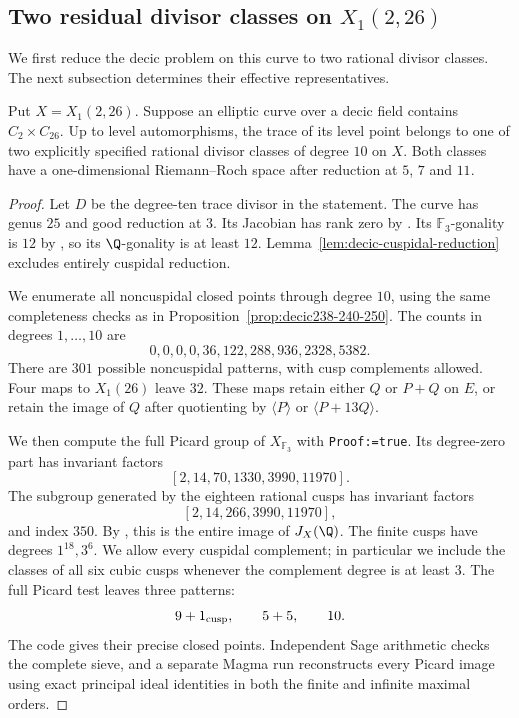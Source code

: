 \subsection{Two residual divisor classes on $X_1(2,26)$}
We first reduce the decic problem on this curve to two rational divisor
classes. The next subsection determines their effective representatives.
\begin{proposition}\label{prop:decic226-residual}
Put $X=X_1(2,26)$. Suppose an elliptic curve over a decic field
contains $C_2\times C_{26}$. Up to level automorphisms, the trace
of its level point belongs to one of two explicitly specified
rational divisor classes of degree $10$ on $X$. Both classes have a
one-dimensional Riemann--Roch space after reduction at $5$, $7$ and
$11$.
\end{proposition}
\begin{proof}
Let $D$ be the degree-ten trace divisor in the statement.
The curve has genus $25$ and good reduction at $3$. Its Jacobian has
rank zero by \cite[Theorem~4.1]{DS}.
Its $\mathbb F_3$-gonality is $12$ by \cite[Table~1]{NV}, so its
$\Q$-gonality is at least $12$. Lemma~\ref{lem:decic-cuspidal-reduction}
excludes entirely cuspidal reduction.

We enumerate all noncuspidal closed points through degree $10$,
using the same completeness checks as in
Proposition~\ref{prop:decic238-240-250}. The counts in degrees
$1,\ldots,10$ are
\[
 0,0,0,0,36,122,288,936,2328,5382.
\]
There are $301$ possible noncuspidal patterns, with cusp complements
allowed. Four maps to $X_1(26)$ leave $32$. These maps retain either
$Q$ or $P+Q$ on $E$, or retain the image of $Q$ after quotienting by
$\langle P\rangle$ or $\langle P+13Q\rangle$.

We then compute the full Picard group of $X_{\mathbb F_3}$ with
\texttt{Proof:=true}. Its degree-zero part has invariant factors
\[
 [2,14,70,1330,3990,11970].
\]
The subgroup generated by the eighteen rational cusps has invariant factors
\[
 [2,14,266,3990,11970],
\]
and index $350$.
By \cite[Proposition~4.16 and Table~3]{DEHMZ}, this is the entire
image of $J_X(\Q)$. The finite cusps have degrees $1^{18},3^6$.
We allow every cuspidal complement; in particular we include the
classes of all six cubic cusps whenever the complement degree is
at least $3$. The full Picard test leaves three patterns:
\[
 9+1_{\rm cusp},\qquad 5+5,\qquad 10.
\]
The code gives their precise closed points. Independent Sage
arithmetic checks the complete sieve, and a separate Magma run
reconstructs every Picard image using exact principal ideal
identities in both the finite and infinite maximal orders.


\end{proof}
